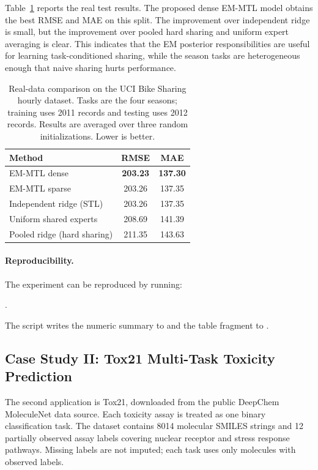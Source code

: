 \documentclass[preprint,12pt]{elsarticle}
\begin{document}
	Table~\ref{tab:bike_real_results} reports the real test results. The
	proposed dense EM-MTL model obtains the best RMSE and MAE on this split.
	The improvement over independent ridge is small, but the improvement over
	pooled hard sharing and uniform expert averaging is clear. This indicates
	that the EM posterior responsibilities are useful for learning
	task-conditioned sharing, while the season tasks are heterogeneous enough
	that naive sharing hurts performance.
	
	\begin{table}[t]
		\centering
		\caption{Real-data comparison on the UCI Bike Sharing hourly dataset.
			Tasks are the four seasons; training uses 2011 records and testing
			uses 2012 records. Results are averaged over three random
			initializations. Lower is better.}
		\label{tab:bike_real_results}
		\begin{tabular}{lcc}
			\toprule
			Method & RMSE & MAE \\
			\midrule
			EM-MTL dense & \textbf{203.23} & \textbf{137.30} \\
			EM-MTL sparse & 203.26 & 137.35 \\
			Independent ridge (STL) & 203.26 & 137.35 \\
			Uniform shared experts & 208.69 & 141.39 \\
			Pooled ridge (hard sharing) & 211.35 & 143.63 \\
			\bottomrule
		\end{tabular}
	\end{table}
	
	\paragraph{Reproducibility.}
	The experiment can be reproduced by running:
	\begin{center}
	.
	\end{center}
	The script writes the numeric summary to
	 and the table
	fragment to
	.
	
	\subsection{Case Study II: Tox21 Multi-Task Toxicity Prediction}
	
	The second application is Tox21, downloaded from the public DeepChem
	MoleculeNet data source. Each toxicity assay is treated as one binary
	classification task. The dataset contains 8014 molecular SMILES strings
	and 12 partially observed assay labels covering nuclear receptor and
	stress response pathways. Missing labels are not imputed; each task uses
	only molecules with observed labels.
	
\end{document}
